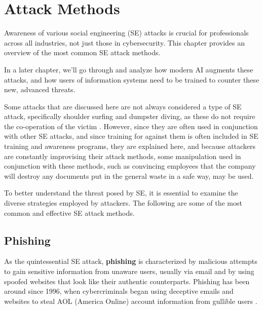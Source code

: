 


\chapter{Attack Methods\label{methods}}

Awareness of various social engineering (SE) attacks is crucial for professionals across all industries, not just those in cybersecurity. This chapter provides an overview of the most common SE attack methods.

In a later chapter, we'll go through and analyze how modern AI augments these attacks, and how users of information systems need to be trained to counter these new, advanced threats.

Some attacks that are discussed here are not always considered a type of SE attack, specifically shoulder surfing and dumpster diving, as these do not require the co-operation of the victim \citep{wang_defining_2020}. However, since they are often used in conjunction with other SE attacks, and since training for against them is often included in SE training and awareness programs, they are explained here, and because attackers are constantly improvising their attack methods, some manipulation used in conjunction with these methods, such as convincing employees that the company will destroy any documents put in the general waste in a safe way, may be used.

To better understand the threat posed by SE, it is essential to examine the diverse strategies employed by attackers. The following are some of the most common and effective SE attack methods.






\section{Phishing}

As the quintessential SE attack, \textbf{phishing} is characterized by malicious attempts to gain sensitive information from unaware users, usually via email and by using spoofed websites that look like their authentic counterparts. Phishing has been around since 1996, when cybercriminals began using deceptive emails and websites to steal AOL (America Online) account information from gullible users \citep{wang_defining_2020}.

